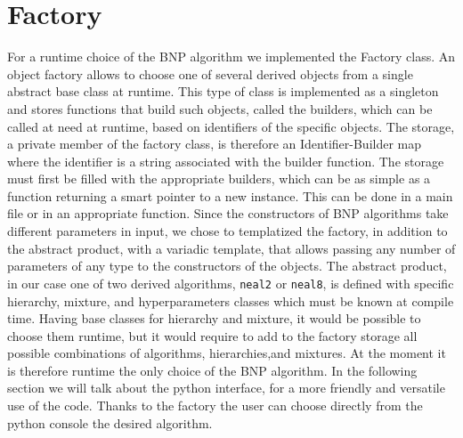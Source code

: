 \chapter{Factory}
For a runtime choice of the BNP algorithm we implemented the Factory class.
An object factory allows to choose one of several derived objects from a single abstract base class at runtime.  This type of class is implemented as a singleton and stores functions that build such objects, called the builders, which can be called at need at runtime, based on identifiers of the specific objects. The storage, a private member of the factory class, is therefore an Identifier-Builder map where the identifier is a string associated with the builder function.
 The storage must first be filled with the appropriate builders, which can be as simple as a function returning a smart pointer to a new instance. This can be done in a main file or in an appropriate function.
Since the constructors of BNP algorithms take different parameters in input, we chose to templatized the factory, in addition to the abstract product, with a variadic template, that allows passing any number of parameters of any type to the constructors of the objects. 
The abstract product, in our case one of two derived algorithms, \verb|neal2| or \verb|neal8|, is defined with specific hierarchy, mixture, and hyperparameters classes which must be known at compile time. Having base classes for hierarchy and mixture, it would be possible to choose them runtime, but it would require to add to the factory storage all possible combinations of algorithms, hierarchies,and mixtures.
At the moment it is therefore runtime the only choice of the BNP algorithm.
In the following section we will talk about the python interface, for a more friendly and versatile use of the code. Thanks to the factory the user can choose directly from the python console the desired algorithm.
